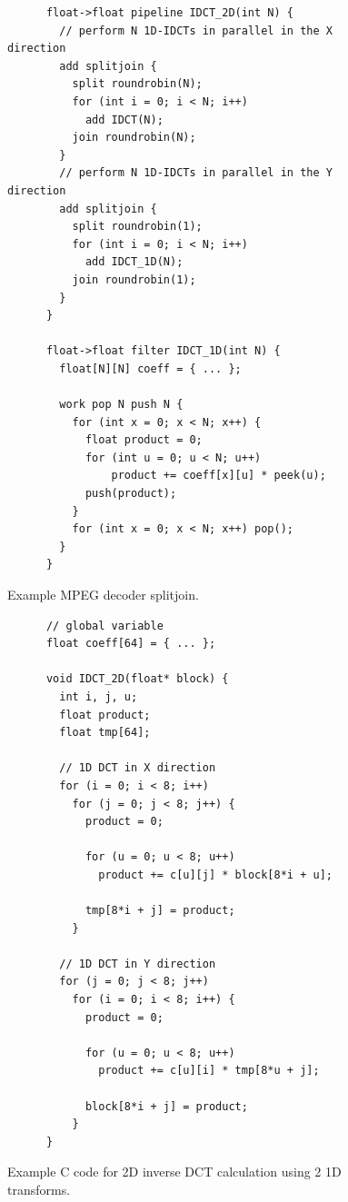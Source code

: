\begin{figure}[t]
  \begin{scriptsize}
    \begin{verbatim}
      float->float pipeline IDCT_2D(int N) {
        // perform N 1D-IDCTs in parallel in the X direction
        add splitjoin {
          split roundrobin(N);
          for (int i = 0; i < N; i++)
            add IDCT(N);
          join roundrobin(N);
        }
        // perform N 1D-IDCTs in parallel in the Y direction
        add splitjoin {
          split roundrobin(1);
          for (int i = 0; i < N; i++)
            add IDCT_1D(N);
          join roundrobin(1);
        }
      }

      float->float filter IDCT_1D(int N) {
        float[N][N] coeff = { ... };
        
        work pop N push N {
          for (int x = 0; x < N; x++) {
            float product = 0;
            for (int u = 0; u < N; u++)
                product += coeff[x][u] * peek(u);
            push(product);
          }
          for (int x = 0; x < N; x++) pop();
        }
      }
    \end{verbatim}
  \end{scriptsize}
  \caption{Example MPEG decoder splitjoin.}
  \label{fig:decoder-sj}
\end{figure}

\begin{figure}[t]
  \begin{scriptsize}
    \begin{verbatim}
      // global variable
      float coeff[64] = { ... };
      
      void IDCT_2D(float* block) {
        int i, j, u;
        float product;
        float tmp[64];
        
        // 1D DCT in X direction
        for (i = 0; i < 8; i++)
          for (j = 0; j < 8; j++) {
            product = 0;

            for (u = 0; u < 8; u++)
              product += c[u][j] * block[8*i + u];

            tmp[8*i + j] = product;
          }

        // 1D DCT in Y direction
        for (j = 0; j < 8; j++)
          for (i = 0; i < 8; i++) {
            product = 0;

            for (u = 0; u < 8; u++)
              product += c[u][i] * tmp[8*u + j];

            block[8*i + j] = product;
          }
      }
    \end{verbatim}
  \end{scriptsize}
  \vspace{-12pt}
  \caption{Example C code for 2D inverse DCT calculation using 2 1D transforms.}
  \label{fig:idct_creference}
\end{figure}

